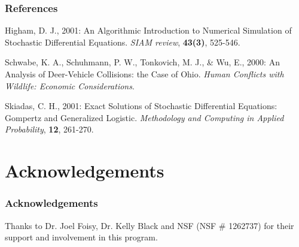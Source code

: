 \documentclass{beamer}   %
\begin{document}
\begin{frame}
    \frametitle{References}

\begin{thebibliography}{3}

Higham, D. J., 2001:
An Algorithmic Introduction to Numerical Simulation of Stochastic Differential Equations.
\emph{SIAM review},
\textbf{43(3)}, 525-546.

Schwabe, K. A., Schuhmann, P. W., Tonkovich, M. J., \& Wu, E., 2000:
An Analysis of Deer-Vehicle Collisions: the Case of Ohio.
\emph{Human Conflicts with Wildlife: Economic Considerations}.

Skiadas, C. H., 2001:
Exact Solutions of Stochastic Differential Equations: Gompertz and Generalized Logistic.
\emph{Methodology and Computing in Applied Probability},
\textbf{12}, 261-270.

\end{thebibliography}

\end{frame}



\section{Acknowledgements}

\begin{frame}
    \frametitle{Acknowledgements}
	Thanks to Dr. Joel Foisy, Dr. Kelly Black and NSF (NSF \# 1262737) for their support and involvement in this program.
\end{frame}
\end{document}

